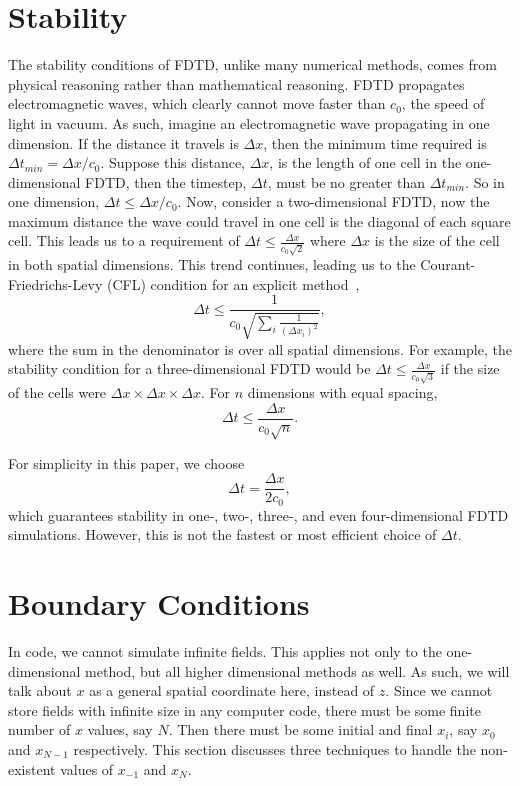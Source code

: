\documentclass[12pt,twocolumn]{article}
\begin{document}
\section{Stability}
The stability conditions of FDTD, unlike many numerical methods, comes from physical reasoning rather than mathematical reasoning. FDTD propagates electromagnetic waves, which clearly cannot move faster than $c_0$, the speed of light in vacuum. As such, imagine an electromagnetic wave propagating in one dimension. If the distance it travels is $\Delta x$, then the minimum time required is $\Delta t_{\textit{min}} = \Delta x/c_0$. Suppose this distance, $\Delta x$, is the length of one cell in the one-dimensional FDTD, then the timestep, $\Delta t$, must be no greater than $\Delta t_\textit{min}$. So in one dimension, $\Delta t \leq \Delta x/c_0$. Now, consider a two-dimensional FDTD, now the maximum distance the wave could travel in one cell is the diagonal of each square cell. This leads us to a requirement of $\Delta t \leq \frac{\Delta x}{c_0\sqrt{2}}$ where $\Delta x$ is the size of the cell in both spatial dimensions. This trend continues, leading us to the Courant-Friedrichs-Levy (CFL) condition for an explicit method~\cite{Courant28},
\begin{equation}
\Delta t \leq \frac{1}{c_0\sqrt{\sum_i\frac{1}{(\Delta x_i)^2}}},
\end{equation}
where the sum in the denominator is over all spatial dimensions. For example, the stability condition for a three-dimensional FDTD would be $\Delta t \leq \frac{\Delta x}{c_0\sqrt{3}}$ if the size of the cells were $\Delta x \times \Delta x \times \Delta x$. For $n$ dimensions with equal spacing,
\begin{equation}
\Delta t \leq \frac{\Delta x}{c_0\sqrt{n}}.
\end{equation}

For simplicity in this paper, we choose
\begin{equation}
\label{eq:deltat}
\Delta t = \frac{\Delta x}{2 c_0},
\end{equation}
which guarantees stability in one-, two-, three-, and even four-dimensional FDTD simulations. However, this is not the fastest or most efficient choice of $\Delta t$.

\section{Boundary Conditions}
In code, we cannot simulate infinite fields. This applies not only to the one-dimensional method, but all higher dimensional methods as well. As such, we will talk about $x$ as a general spatial coordinate here, instead of $z$. Since we cannot store fields with infinite size in any computer code, there must be some finite number of $x$ values, say $N$. Then there must be some initial and final $x_i$, say $x_0$ and $x_{N-1}$ respectively. This section discusses three techniques to handle the non-existent values of $x_{-1}$ and $x_{N}$.
\end{document}
